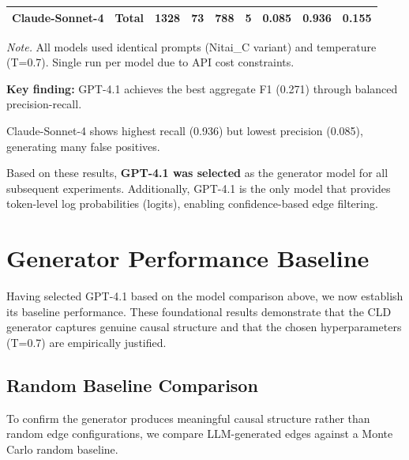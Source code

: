 \begin{table}[H]
\begin{threeparttable}
\begin{tabular}{llccccccc}
Claude-Sonnet-4 & Total & 1328 & 73 & 788 & 5 & 0.085 & \textbf{0.936} & 0.155 \\
\bottomrule
\end{tabular}
\begin{tablenotes}
\small
\item \textit{Note.} All models used identical prompts (Nitai\_C variant) and temperature (T=0.7). Single run per model due to API cost constraints.
\item \textbf{Key finding:} GPT-4.1 achieves the best aggregate F1 (0.271) through balanced precision-recall.
\item Claude-Sonnet-4 shows highest recall (0.936) but lowest precision (0.085), generating many false positives.
\item Based on these results, \textbf{GPT-4.1 was selected} as the generator model for all subsequent experiments. Additionally, GPT-4.1 is the only model that provides token-level log probabilities (logits), enabling confidence-based edge filtering.
\end{tablenotes}
\end{threeparttable}
\end{table}

\section{Generator Performance Baseline}

Having selected GPT-4.1 based on the model comparison above, we now establish its baseline performance. These foundational results demonstrate that the CLD generator captures genuine causal structure and that the chosen hyperparameters (T=0.7) are empirically justified.

\subsection{Random Baseline Comparison}

To confirm the generator produces meaningful causal structure rather than random edge configurations, we compare LLM-generated edges against a Monte Carlo random baseline.

